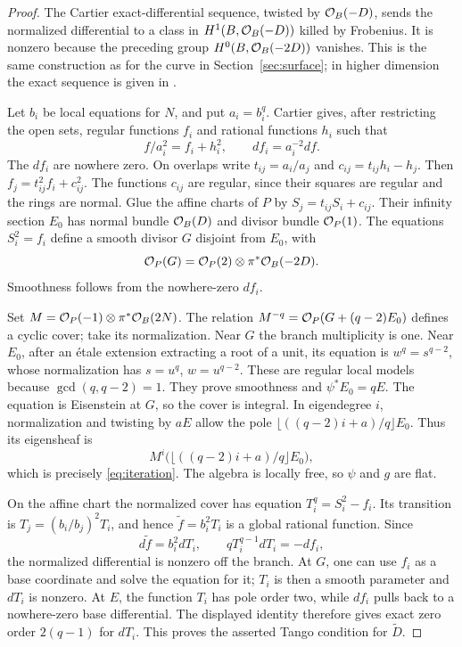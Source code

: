 \begin{proof}
The Cartier exact-differential sequence, twisted by $\mathcal O_B(-D)$, sends the normalized differential to a class in $H^1(B,\mathcal O_B(-D))$ killed by Frobenius. It is nonzero because the preceding group $H^0(B,\mathcal O_B(-2D))$ vanishes. This is the same construction as for the curve in Section~\ref{sec:surface}; in higher dimension the exact sequence is given in \citet[Theorem 1 and Lemma 1.4, pp.~1, 4--5 of the preprint]{Mukai}.

Let $b_i$ be local equations for $N$, and put $a_i=b_i^q$. Cartier gives, after restricting the open sets, regular functions $f_i$ and rational functions $h_i$ such that
\[
 f/a_i^2=f_i+h_i^2,\qquad df_i=a_i^{-2}df.
\]
The $df_i$ are nowhere zero. On overlaps write $t_{ij}=a_i/a_j$ and $c_{ij}=t_{ij}h_i-h_j$. Then
$f_j=t_{ij}^2f_i+c_{ij}^2$. The functions $c_{ij}$ are regular, since their squares are regular and the rings are normal. Glue the affine charts of $P$ by
$S_j=t_{ij}S_i+c_{ij}$. Their infinity section $E_0$ has normal bundle $\mathcal O_B(D)$ and divisor bundle $\mathcal O_P(1)$. The equations $S_i^2=f_i$ define a smooth divisor $G$ disjoint from $E_0$, with
\[
 \mathcal O_P(G)=\mathcal O_P(2)\otimes\pi^*\mathcal O_B(-2D).
\]
Smoothness follows from the nowhere-zero $df_i$.

Set $M=\mathcal O_P(-1)\otimes\pi^*\mathcal O_B(2N)$. The relation
$M^{-q}=\mathcal O_P(G+(q-2)E_0)$ defines a cyclic cover; take its normalization. Near $G$ the branch multiplicity is one. Near $E_0$, after an étale extension extracting a root of a unit, its equation is $w^q=s^{q-2}$, whose normalization has $s=u^q$, $w=u^{q-2}$. These are regular local models because $\gcd(q,q-2)=1$. They prove smoothness and $\psi^*E_0=qE$. The equation is Eisenstein at $G$, so the cover is integral. In eigendegree $i$, normalization and twisting by $aE$ allow the pole $\lfloor((q-2)i+a)/q\rfloor E_0$. Thus its eigensheaf is
\[
 M^i\bigl(\lfloor((q-2)i+a)/q\rfloor E_0\bigr),
\]
which is precisely \eqref{eq:iteration}. The algebra is locally free, so $\psi$ and $g$ are flat.

On the affine chart the normalized cover has equation
$T_i^q=S_i^2-f_i$. Its transition is $T_j=(b_i/b_j)^2T_i$, and hence $\widetilde f=b_i^2T_i$ is a global rational function. Since
\[
 d\widetilde f=b_i^2dT_i,\qquad qT_i^{q-1}dT_i=-df_i,
\]
the normalized differential is nonzero off the branch. At $G$, one can use $f_i$ as a base coordinate and solve the equation for it; $T_i$ is then a smooth parameter and $dT_i$ is nonzero. At $E$, the function $T_i$ has pole order two, while $df_i$ pulls back to a nowhere-zero base differential. The displayed identity therefore gives exact zero order $2(q-1)$ for $dT_i$. This proves the asserted Tango condition for $\widetilde D$.


\end{proof}
